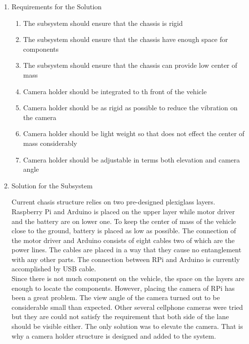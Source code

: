 \documentclass[a4paper,12pt]{article}
\begin{document}
		\begin{enumerate}
			\item {Requirements for the Solution}
			
			\begin{enumerate}
					\item The subsystem should ensure that the chassis is rigid 
					\item The subsystem should ensure that the chassis have enough space for components
					\item The subsystem should ensure that the chassis can provide low center of mass 
					\item Camera holder should be integrated to th front of the vehicle
	 				\item Camera holder should be as rigid as possible to reduce the vibration on the camera
	 				\item Camera holder should be light weight so that does not effect the center of mass considerably
	 				\item Camera holder should be adjustable in terms both elevation and camera angle
	
				\end{enumerate}
				
			\item {Solution for the Subsystem}
			
			Current chasis structure relies on two pre-designed plexiglass layers. Raspberry Pi and Arduino is placed on the upper layer while motor driver and the battery are on lower one. To keep the center of mass of the vehicle close to the ground, battery is placed as low as possible. The connection of the motor driver and Arduino consists of eight cables two of which are the power lines. The cables are placed in a way that they cause no entanglement with any other parts. The connection between RPi and Arduino is currently accomplished by USB cable. \\
	
	Since there is not much component on the vehicle, the space on the layers are enough to locate the components. However, placing the camera of RPi has been a great problem. The view angle of the camera turned out to be considerable small than expected. Other several cellphone cameras were tried but they are could not satisfy the requirement that both side of the lane should be visible either. The only solution was to elevate the camera. That is why a camera holder structure is designed and added to the system.\\	
	

\end{enumerate}
\end{document}
